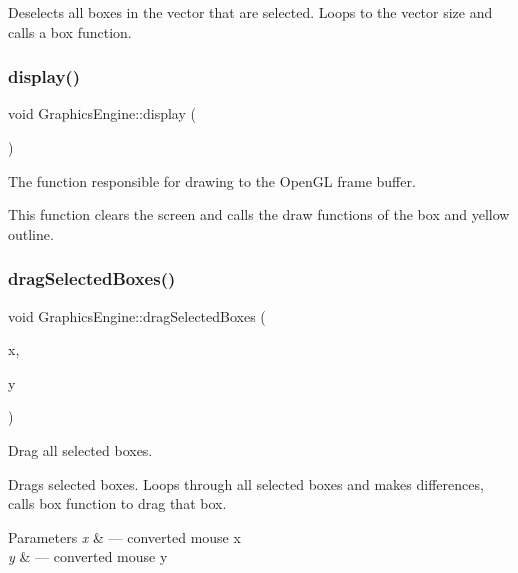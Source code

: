 Deselects all boxes in the vector that are selected. Loops to the vector size and calls a box function. \mbox{\label{class_graphics_engine_a2f0bdf1a47bf9e8d4f1c9525c2ebc8f9}} 
\subsubsection{\texorpdfstring{display()}{display()}}
{\footnotesize\ttfamily void Graphics\+Engine\+::display (\begin{DoxyParamCaption}{ }\end{DoxyParamCaption})}



The function responsible for drawing to the Open\+GL frame buffer. 

This function clears the screen and calls the draw functions of the box and yellow outline. \mbox{\label{class_graphics_engine_ae10f5983900c72c2997ed6665bb245be}} 
\subsubsection{\texorpdfstring{drag\+Selected\+Boxes()}{dragSelectedBoxes()}}
{\footnotesize\ttfamily void Graphics\+Engine\+::drag\+Selected\+Boxes (\begin{DoxyParamCaption}\item[{G\+Lfloat}]{x,  }\item[{G\+Lfloat}]{y }\end{DoxyParamCaption})}



Drag all selected boxes. 

Drags selected boxes. Loops through all selected boxes and makes differences, calls box function to drag that box.


\begin{DoxyParams}{Parameters}
{\em x} & --- converted mouse x \\
\hline
{\em y} & --- converted mouse y \\
\hline
\end{DoxyParams}
\mbox{\label{class_graphics_engine_a6b07e2201e276bb406d3436d382049c9}} 
